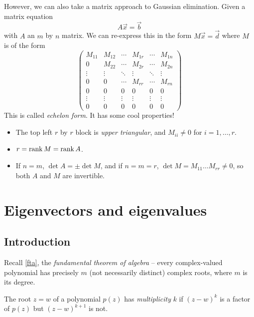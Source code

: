 \documentclass{../../template/note}
\begin{document}
    However, we can also take a matrix approach to Gaussian elimination. Given a matrix equation
    \[
        A \vec x = \vec b
    \]
    with \(A\) an \(m\) by \(n\) matrix. We can re-express this in the form \(M \vec x = \vec d\) where \(M\) is of the form
    \[
        \begin{pmatrix}
         M_{11} & M_{12} & \cdots & M_{1r} & \cdots & M_{1n} \\
         0 & M_{22} & \cdots & M_{2r} & \cdots & M_{2n} \\
         \vdots & \vdots & \ddots & \vdots & \ddots & \vdots \\
         0 & 0 & \cdots & M_{rr} & \cdots & M_{rn} \\
         0 & 0 & 0 & 0 & 0 & 0 \\
         \vdots & \vdots & \vdots & \vdots & \vdots & \vdots \\
         0 & 0 & 0 & 0 & 0 & 0
        \end{pmatrix}
    \]
    This is called \emph{echelon form}. It has some cool properties!
    \begin{itemize}
        \item The top left \(r\) by \(r\) block is \emph{upper triangular}, and \(M_{ii} \neq 0\) for \(i = 1, \dots, r\).
        \item \(r = \operatorname{rank} M = \operatorname{rank} A\).
        \item If \(n = m\), \(\det A = \pm \det M\), and if \(n=m=r\), \(\det M = M_{11}\dots M_{rr} \neq 0\), so both \(A\) and \(M\) are invertible.
    \end{itemize}
    
    \section{Eigenvectors and eigenvalues}

    \subsection{Introduction}

    Recall \cref{fta}, the \emph{fundamental theorem of algebra} -- every complex-valued polynomial has precisely \(m\) (not necessarily distinct) complex roots, where \(m\) is its degree.
    
    \begin{definition}
        The root \(z = w\) of a polynomial \(p(z)\) has \emph{multiplicity} \(k\) if \((z-w)^k\) is a factor of \(p(z)\) but \((z-w)^{k+1}\) is not.
    \end{definition}
    
\end{document}

